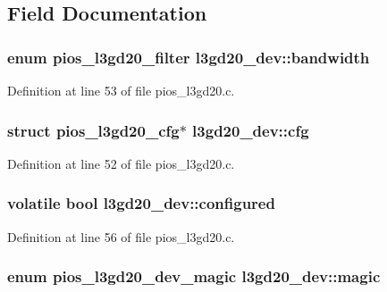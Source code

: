 \subsection{\-Field \-Documentation}
\hypertarget{structl3gd20__dev_a0083cd18fa543ff4b6cf593ffd4ddf19}{
\subsubsection[{bandwidth}]{\setlength{\rightskip}{0pt plus 5cm}enum {\bf pios\-\_\-l3gd20\-\_\-filter} {\bf l3gd20\-\_\-dev\-::bandwidth}}}\label{structl3gd20__dev_a0083cd18fa543ff4b6cf593ffd4ddf19}


\-Definition at line 53 of file pios\-\_\-l3gd20.\-c.

\hypertarget{structl3gd20__dev_af09c2ac64d5d4b325ba45fa55554eecb}{
\subsubsection[{cfg}]{\setlength{\rightskip}{0pt plus 5cm}struct {\bf pios\-\_\-l3gd20\-\_\-cfg}$\ast$ {\bf l3gd20\-\_\-dev\-::cfg}}}\label{structl3gd20__dev_af09c2ac64d5d4b325ba45fa55554eecb}


\-Definition at line 52 of file pios\-\_\-l3gd20.\-c.

\hypertarget{structl3gd20__dev_a1a9fd22015b26a283f294efe6824ff51}{
\subsubsection[{configured}]{\setlength{\rightskip}{0pt plus 5cm}volatile bool {\bf l3gd20\-\_\-dev\-::configured}}}\label{structl3gd20__dev_a1a9fd22015b26a283f294efe6824ff51}


\-Definition at line 56 of file pios\-\_\-l3gd20.\-c.

\hypertarget{structl3gd20__dev_abfaba1dcc53adeb1fe6ba7fdb174d78a}{
\subsubsection[{magic}]{\setlength{\rightskip}{0pt plus 5cm}enum {\bf pios\-\_\-l3gd20\-\_\-dev\-\_\-magic} {\bf l3gd20\-\_\-dev\-::magic}}}\label{structl3gd20__dev_abfaba1dcc53adeb1fe6ba7fdb174d78a}


